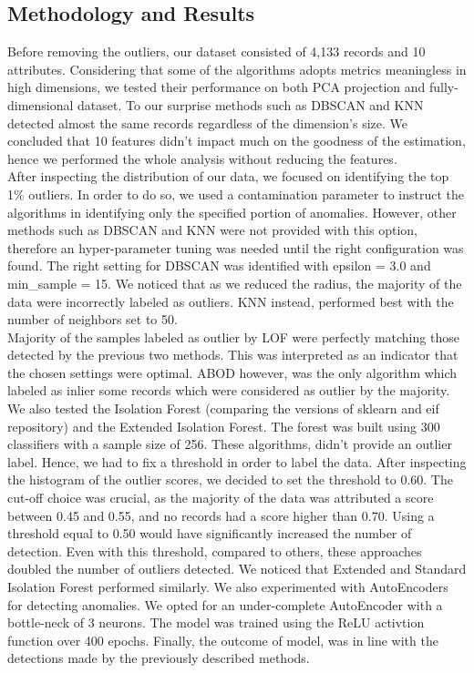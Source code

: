 \subsection{Methodology and Results}
Before removing the outliers, our dataset consisted of 4,133 records and 10 attributes. Considering that some of the algorithms adopts metrics meaningless in high dimensions, we tested their performance on both PCA projection and fully-dimensional dataset. To our surprise methods such as DBSCAN and KNN detected almost the same records regardless of the dimension's size. We concluded that 10 features didn't impact much on the goodness of the estimation, hence we performed the whole analysis without reducing the features.\\After inspecting the distribution of our data, we focused on identifying the top 1\% outliers. In order to do so, we used a contamination parameter to instruct the algorithms in identifying only the specified portion of anomalies. However, other methods such as DBSCAN and KNN were not provided with this option, therefore an hyper-parameter tuning was needed until the right configuration was found. The right setting for DBSCAN was identified with epsilon = 3.0 and min\_sample = 15. We noticed that as we reduced the radius, the majority of the data were incorrectly labeled as outliers. KNN instead, performed best with the number of neighbors set to 50. \\Majority of the samples labeled as outlier by LOF were perfectly matching those detected by the previous two methods. This was interpreted as an indicator that the chosen settings were optimal. ABOD however, was the only algorithm which labeled as inlier some records which were considered as outlier by the majority. 
We also tested the Isolation Forest (comparing the versions of sklearn and eif repository) and the Extended Isolation Forest. The forest was built using 300 classifiers with a sample size of 256. These algorithms, didn't provide an outlier label. Hence, we had to fix a threshold in order to label the data. After inspecting the histogram of the outlier scores, we decided to set the threshold to 0.60. The cut-off choice was crucial, as the majority of the data was attributed a score between 0.45 and 0.55, and no records had a score higher than 0.70. Using a threshold equal to 0.50 would have significantly increased the number of detection. 
Even with this threshold, compared to others, these approaches doubled the number of outliers detected.  
We noticed that Extended and Standard Isolation Forest performed similarly. We also experimented with AutoEncoders for detecting anomalies. We opted for an under-complete AutoEncoder with a bottle-neck of 3 neurons. The model was trained using the ReLU activtion function over 400 epochs. Finally, the outcome of model, was in line with the detections made by the previously described methods. \\ 
